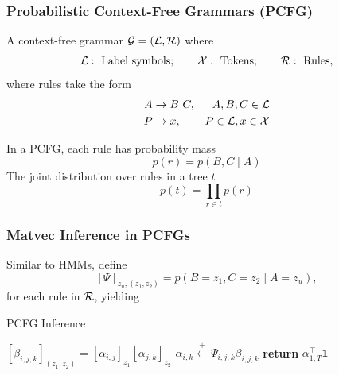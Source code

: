 \documentclass{beamer}
\begin{document}
\begin{frame}
\frametitle{Probabilistic Context-Free Grammars (PCFG)}
A context-free grammar $\mathcal{G} = (\mathcal{L},\mathcal{R})$ where
$$
    \mathcal{L}: \text{ Label symbols};\qquad
    \mathcal{X}: \text{ Tokens};\qquad
    \mathcal{R}: \text{ Rules},
$$
where rules take the form
\begin{align*}
A&\to B\ C, & A,B,C\in\mathcal{L} \\
P&\to x, & P \in\mathcal{L},x\in\mathcal{X}
\end{align*}

In a PCFG, each rule has probability mass
$$p(r) = p(B,C \mid A)$$
The joint distribution over rules in a tree $t$
$$p(t) = \prod_{r\in t} p(r)$$

\end{frame}

\begin{frame}
\frametitle{Matvec Inference in PCFGs}

Similar to HMMs, define
$$[\Psi]_{z_u, (z_1,z_2)} = p(B=z_1,C=z_2 \mid A=z_u),$$
for each rule in $\mathcal{R}$, yielding

\begin{algorithm}[H]
\caption{PCFG Inference}
\begin{algorithmic} 
\STATE $[\beta_{i,j,k}]_{(z_1,z_2)} = [\alpha_{i,j}]_{z_1}[\alpha_{j,k}]_{z_2}$
\ENDFOR
\STATE $\alpha_{i,k} \stackrel{+}{\gets} \Psi_{i,j,k}\beta_{i,j,k}$
\ENDFOR
\STATE \textbf{return} $\alpha_{1,T}^\top \mathbf{1}$
\end{algorithmic}

\end{algorithm}
\end{frame}
\end{document}
